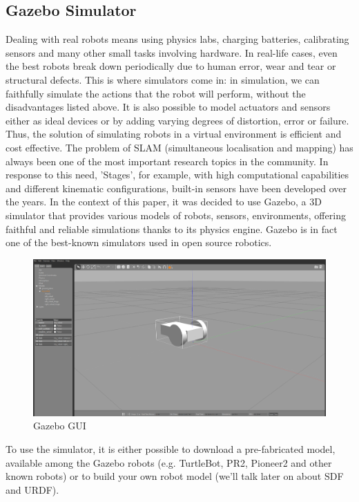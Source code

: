  \subsection{Gazebo Simulator}
Dealing with real robots means using physics labs, charging batteries, calibrating sensors and many other small tasks involving hardware.
In real-life cases, even the best robots break down periodically due to human error, wear and tear or structural defects.  This is where simulators come in: in simulation, we can faithfully simulate the actions that the robot will perform, without the disadvantages listed above.
It is also possible to model actuators and sensors either as ideal devices or by adding varying degrees of distortion, error or failure. Thus, the solution of simulating robots in a virtual environment is efficient and cost effective.
The problem of SLAM (simultaneous localisation and mapping) has always been one of the most important research topics in the community.
In response to this need, 'Stages', for example, with high computational capabilities and different kinematic configurations, built-in sensors have been developed over the years.
In the context of this paper, it was decided to use Gazebo, a 3D simulator that provides various models of robots, sensors, environments, offering faithful and reliable simulations thanks to its physics engine. Gazebo is in fact one of the best-known simulators used in open source robotics.
 \begin{figure}[H]
     \centering
     \includegraphics[scale=0.25]{Images/Chapter 2/gazebogui.png}
     \caption{Gazebo GUI}
     \label{fig:gazebogui}
 \end{figure}
To use the simulator, it is either possible to download a pre-fabricated model, available among the Gazebo robots (e.g. TurtleBot, PR2, Pioneer2 and other known robots) or to build your own robot model (we'll talk later on about SDF and URDF).
